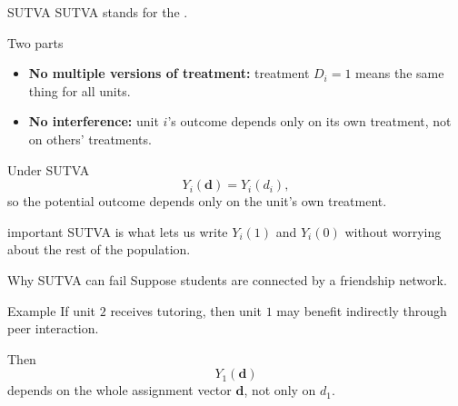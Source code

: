 \documentclass[dvipsnames,aspectratio=169,handout]{beamer}
\begin{document}
\begin{frame}{SUTVA}
SUTVA stands for the .

\begin{block}{Two parts}
\begin{itemize}
    \item \textbf{No multiple versions of treatment:} treatment $D_i=1$ means the same thing for all units.
    \item \textbf{No interference:} unit $i$'s outcome depends only on its own treatment, not on others' treatments.
\end{itemize}
\end{block}

\begin{alertblock}{Under SUTVA}
\[
Y_i(\mathbf d)=Y_i(d_i),
\]
so the potential outcome depends only on the unit's own treatment.
\end{alertblock}

\begin{beamercolorbox}[wd=\textwidth,sep=8pt,center,rounded=true,shadow=true]{important}
SUTVA is what lets us write $Y_i(1)$ and $Y_i(0)$ without worrying about the rest of the population.
\end{beamercolorbox}
\end{frame}

\begin{frame}{Why SUTVA can fail}
Suppose students are connected by a friendship network.

\begin{center}
\end{center}

\begin{block}{Example}
If unit $2$ receives tutoring, then unit $1$ may benefit indirectly through peer interaction.
\end{block}

\begin{alertblock}{Then}
\[
Y_1(\mathbf d)
\]
depends on the whole assignment vector $\mathbf d$, not only on $d_1$.
\end{alertblock}
\end{frame}
\end{document}
